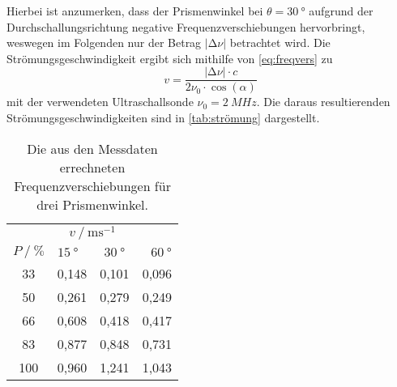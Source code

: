 Hierbei ist anzumerken, dass der Prismenwinkel bei $\theta  = \qty{30}{°}$ aufgrund der Durchschallungsrichtung negative Frequenzverschiebungen hervorbringt,
weswegen im Folgenden nur der Betrag $| \increment \nu |$ betrachtet wird.
Die Strömungsgeschwindigkeit ergibt sich mithilfe von \autoref{eq:freqvers} zu
\begin{equation}
  v = \frac{| \increment \nu | \cdot c}{2 \nu_0 \cdot \cos (\alpha)}
\end{equation}
mit der verwendeten Ultraschallsonde $\nu_0 = \qty{2}{MHz}$.
Die daraus resultierenden Strömungsgeschwindigkeiten sind in \autoref{tab:strömung} dargestellt.
\begin{table}
  \centering
  \caption{Die aus den Messdaten errechneten Frequenzverschiebungen für drei Prismenwinkel.}
  \label{tab:strömung}
  \begin{tabular}{c c c c}
    \toprule
    \multicolumn{4}{c}{$v \mathbin{/} \mathrm{ms^{-1}}$} \\
    \cmidrule(lr){1-4}
    
    \multicolumn{1}{c}{$P \mathbin{/} \% $} &
    \multicolumn{3}{c}{$\qty{15}{°} \qquad \qty{30}{°} \qquad \qty{60}{°}$} \\
    \cmidrule(lr){1-1}\cmidrule(lr){2-4}

       33 & 0,148 &   0,101 &    0,096 \\
       50 & 0,261 &   0,279 &    0,249 \\
       66 & 0,608 &   0,418 &    0,417 \\
       83 & 0,877 &   0,848 &    0,731 \\
      100 & 0,960 &   1,241 &    1,043 \\
    \bottomrule
  \end{tabular}
\end{table}

